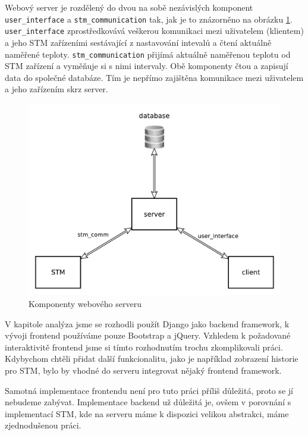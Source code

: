 
Webový server je rozdělený do dvou na sobě nezávislých komponent \texttt{user\_interface} a
\texttt{stm\_communication} tak, jak je to znázorněno na obrázku \ref{server-overview}.
\texttt{user\_interface} zprostředkovává veškerou komunikaci mezi uživatelem (klientem) a jeho STM
zařízeními sestávající z nastavování intevalů a čtení aktuálně naměřené teploty.
\texttt{stm\_communication} přijímá aktuálně naměřenou teplotu od STM zařízení a vyměňuje si s nimi intervaly.
Obě komponenty čtou a zapisují data do společné databáze.
Tím je nepřímo zajištěna komunikace mezi uživatelem a jeho zařízením skrz server.

\begin{figure}[tbh]\centering
\includegraphics[scale=0.6]{../img/server_overview.pdf}
\caption{Komponenty webového serveru}
\label{server-overview}
\end{figure}

V kapitole analýza jsme se rozhodli použít Django jako backend framework, k vývoji frontend
používáme pouze Bootstrap a jQuery.
Vzhledem k požadované interaktivitě frontend jsme si tímto rozhodnutím trochu zkomplikovali práci.
Kdybychom chtěli přidat další funkcionalitu, jako je například zobrazení historie pro STM,
bylo by vhodné do serveru integrovat nějaký frontend framework.

Samotná implementace frontendu není pro tuto práci příliš důležitá, proto se jí nebudeme zabývat.
Implementace backend už důležitá je, ovšem v porovnání s implementací STM, kde na serveru máme
k dispozici velikou abstrakci, máme zjednodušenou práci.

